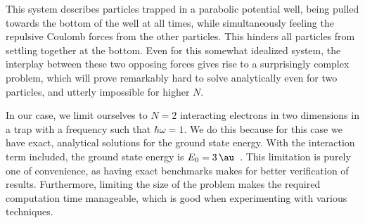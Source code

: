 \documentclass[Thesis.tex]{subfiles}
\begin{document}
This system describes particles trapped in a parabolic potential well, being pulled
towards the bottom of the well at all times, while simultaneously feeling the repulsive
Coulomb forces from the other particles. This hinders all particles from settling together
at the bottom. Even for this somewhat idealized system, the interplay between these two
opposing forces gives rise to a surprisingly complex problem, which will prove remarkably
hard to solve analytically even for two particles, and utterly impossible for higher $N$.

In our case, we limit ourselves to $N=2$ interacting electrons in two
dimensions in a trap with a frequency such that $\hbar \omega = 1$. We do this because for
this case we have exact, analytical solutions for the ground state energy. With the
interaction term included, the ground state energy is $E_0 = \SI{3}{\au}$~\cite{Taut1993}.
This limitation is purely one of convenience, as having exact benchmarks makes for better
verification of results. Furthermore, limiting the size of the problem makes the required
computation time manageable, which is good when experimenting with various techniques.
\end{document}
